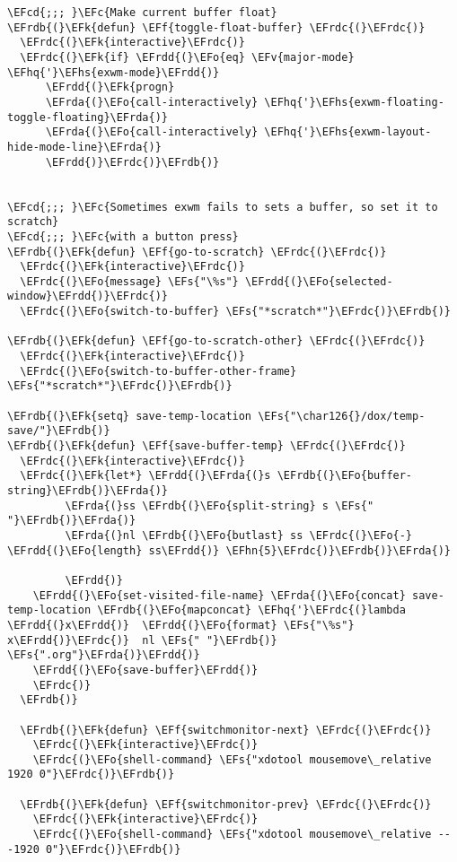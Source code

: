 \documentclass[a4wide,10pt]{article}
\newcommand{\EFc}[1]{\textcolor{EFc}{#1}} %
\newcommand{\EFcd}[1]{\textcolor{EFcd}{#1}} %
\newcommand{\EFs}[1]{\textcolor{EFs}{#1}} %
\newcommand{\EFk}[1]{\textcolor{EFk}{#1}} %
\newcommand{\EFf}[1]{\textcolor{EFf}{#1}} %
\newcommand{\EFv}[1]{\textcolor{EFv}{#1}} %
\newcommand{\EFo}[1]{\textcolor{EFo}{#1}} %
\newcommand{\EFhn}[1]{\textcolor{EFhn}{\textbf{#1}}} %
\newcommand{\EFhq}[1]{\textcolor{EFhq}{#1}} %
\newcommand{\EFhs}[1]{\textcolor{EFhs}{#1}} %
\newcommand{\EFrda}[1]{\textcolor{EFrda}{#1}} %
\newcommand{\EFrdb}[1]{\textcolor{EFrdb}{#1}} %
\newcommand{\EFrdc}[1]{\textcolor{EFrdc}{#1}} %
\newcommand{\EFrdd}[1]{\textcolor{EFrdd}{#1}} %
\begin{document}
\begin{Code}
\begin{Verbatim}
\EFcd{;;; }\EFc{Make current buffer float}
\EFrdb{(}\EFk{defun} \EFf{toggle-float-buffer} \EFrdc{(}\EFrdc{)}
  \EFrdc{(}\EFk{interactive}\EFrdc{)}
  \EFrdc{(}\EFk{if} \EFrdd{(}\EFo{eq} \EFv{major-mode} \EFhq{'}\EFhs{exwm-mode}\EFrdd{)}
      \EFrdd{(}\EFk{progn}
      \EFrda{(}\EFo{call-interactively} \EFhq{'}\EFhs{exwm-floating-toggle-floating}\EFrda{)}
      \EFrda{(}\EFo{call-interactively} \EFhq{'}\EFhs{exwm-layout-hide-mode-line}\EFrda{)}
      \EFrdd{)}\EFrdc{)}\EFrdb{)}


\EFcd{;;; }\EFc{Sometimes exwm fails to sets a buffer, so set it to scratch}
\EFcd{;;; }\EFc{with a button press}
\EFrdb{(}\EFk{defun} \EFf{go-to-scratch} \EFrdc{(}\EFrdc{)}
  \EFrdc{(}\EFk{interactive}\EFrdc{)}
  \EFrdc{(}\EFo{message} \EFs{"\%s"} \EFrdd{(}\EFo{selected-window}\EFrdd{)}\EFrdc{)}
  \EFrdc{(}\EFo{switch-to-buffer} \EFs{"*scratch*"}\EFrdc{)}\EFrdb{)}

\EFrdb{(}\EFk{defun} \EFf{go-to-scratch-other} \EFrdc{(}\EFrdc{)}
  \EFrdc{(}\EFk{interactive}\EFrdc{)}
  \EFrdc{(}\EFo{switch-to-buffer-other-frame} \EFs{"*scratch*"}\EFrdc{)}\EFrdb{)}

\EFrdb{(}\EFk{setq} save-temp-location \EFs{"\char126{}/dox/temp-save/"}\EFrdb{)}
\EFrdb{(}\EFk{defun} \EFf{save-buffer-temp} \EFrdc{(}\EFrdc{)}
  \EFrdc{(}\EFk{interactive}\EFrdc{)}
  \EFrdc{(}\EFk{let*} \EFrdd{(}\EFrda{(}s \EFrdb{(}\EFo{buffer-string}\EFrdb{)}\EFrda{)}
         \EFrda{(}ss \EFrdb{(}\EFo{split-string} s \EFs{" "}\EFrdb{)}\EFrda{)}
         \EFrda{(}nl \EFrdb{(}\EFo{butlast} ss \EFrdc{(}\EFo{-} \EFrdd{(}\EFo{length} ss\EFrdd{)} \EFhn{5}\EFrdc{)}\EFrdb{)}\EFrda{)}

         \EFrdd{)}
    \EFrdd{(}\EFo{set-visited-file-name} \EFrda{(}\EFo{concat} save-temp-location \EFrdb{(}\EFo{mapconcat} \EFhq{'}\EFrdc{(}lambda \EFrdd{(}x\EFrdd{)}  \EFrdd{(}\EFo{format} \EFs{"\%s"} x\EFrdd{)}\EFrdc{)}  nl \EFs{" "}\EFrdb{)} \EFs{".org"}\EFrda{)}\EFrdd{)}
    \EFrdd{(}\EFo{save-buffer}\EFrdd{)}
    \EFrdc{)}
  \EFrdb{)}

  \EFrdb{(}\EFk{defun} \EFf{switchmonitor-next} \EFrdc{(}\EFrdc{)}
    \EFrdc{(}\EFk{interactive}\EFrdc{)}
    \EFrdc{(}\EFo{shell-command} \EFs{"xdotool mousemove\_relative 1920 0"}\EFrdc{)}\EFrdb{)}

  \EFrdb{(}\EFk{defun} \EFf{switchmonitor-prev} \EFrdc{(}\EFrdc{)}
    \EFrdc{(}\EFk{interactive}\EFrdc{)}
    \EFrdc{(}\EFo{shell-command} \EFs{"xdotool mousemove\_relative -- -1920 0"}\EFrdc{)}\EFrdb{)}



\end{Verbatim}
\end{Code}
\end{document}
